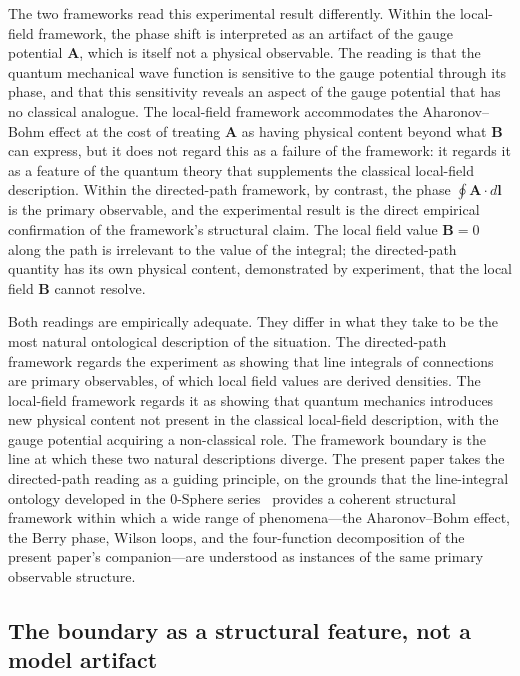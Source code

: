 \documentclass[%
 reprint, amsmath,amssymb, aps, prb, ]{revtex4-2}
\numberwithin{equation}{section}
\begin{document}
The two frameworks read this experimental result differently. Within the local-field framework, the phase shift is interpreted as an artifact of the gauge potential $\mathbf{A}$, which is itself not a physical observable. The reading is that the quantum mechanical wave function is sensitive to the gauge potential through its phase, and that this sensitivity reveals an aspect of the gauge potential that has no classical analogue. The local-field framework accommodates the Aharonov--Bohm effect at the cost of treating $\mathbf{A}$ as having physical content beyond what $\mathbf{B}$ can express, but it does not regard this as a failure of the framework: it regards it as a feature of the quantum theory that supplements the classical local-field description. Within the directed-path framework, by contrast, the phase $\oint\mathbf{A}\cdot d\mathbf{l}$ is the primary observable, and the experimental result is the direct empirical confirmation of the framework's structural claim. The local field value $\mathbf{B}=0$ along the path is irrelevant to the value of the integral; the directed-path quantity has its own physical content, demonstrated by experiment, that the local field $\mathbf{B}$ cannot resolve.

Both readings are empirically adequate. They differ in what they take to be the most natural ontological description of the situation. The directed-path framework regards the experiment as showing that line integrals of connections are primary observables, of which local field values are derived densities. The local-field framework regards it as showing that quantum mechanics introduces new physical content not present in the classical local-field description, with the gauge potential acquiring a non-classical role. The framework boundary is the line at which these two natural descriptions diverge. The present paper takes the directed-path reading as a guiding principle, on the grounds that the line-integral ontology developed in the 0-Sphere series~\cite{hanamura31, hanamura29, hanamura30, hanamura55} provides a coherent structural framework within which a wide range of phenomena---the Aharonov--Bohm effect, the Berry phase, Wilson loops, and the four-function decomposition of the present paper's companion---are understood as instances of the same primary observable structure.

\subsection{The boundary as a structural feature, not a model artifact}
\label{sec:structural_feature}
\end{document}
